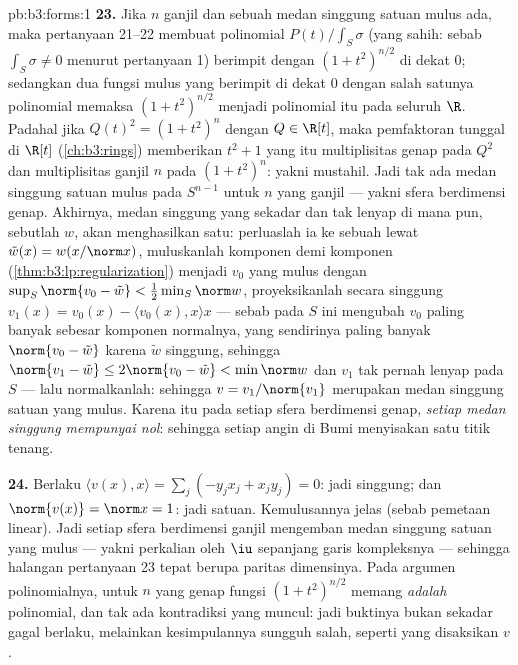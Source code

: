 \begin{solution}{pb:b3:forms:1}
\textbf{23.} Jika $n$ ganjil dan sebuah medan singgung satuan mulus
ada, maka pertanyaan 21--22 membuat polinomial
$P(t)/\int_S\sigma$ (yang sahih: sebab $\int_S\sigma \neq 0$ menurut
pertanyaan 1) berimpit dengan $(1 + t^2)^{n/2}$ di dekat $0$; sedangkan dua
fungsi mulus yang berimpit di dekat $0$ dengan salah satunya polinomial
memaksa $(1 + t^2)^{n/2}$ menjadi polinomial itu pada seluruh
$\R$. Padahal jika $Q(t)^2 = (1 + t^2)^n$ dengan $Q \in \R[t]$,
maka pemfaktoran tunggal di $\R[t]$
(\cref{ch:b3:rings}) memberikan $t^2 + 1$ yang  itu
multiplisitas genap pada $Q^2$ dan multiplisitas ganjil $n$ pada
$(1 + t^2)^n$: yakni mustahil. Jadi tak ada medan singgung satuan mulus
pada $S^{n-1}$ untuk $n$ yang ganjil --- yakni sfera
berdimensi genap. Akhirnya, medan singgung yang sekadar  dan
tak lenyap di mana pun, sebutlah $w$, akan menghasilkan satu: perluaslah ia ke sebuah
 lewat $\tilde w(x) = w(x/\norm x)$, muluskanlah
komponen demi komponen (\cref{thm:b3:lp:regularization}) menjadi
$v_0$ yang mulus dengan $\sup_S\norm{v_0 - \tilde w} <
\frac12\min_S\norm w$, proyeksikanlah secara singgung $v_1(x) = v_0(x)
- \langle v_0(x), x\rangle x$ --- sebab pada $S$ ini mengubah $v_0$
paling banyak sebesar komponen normalnya, yang sendirinya paling banyak $\norm{v_0 -
\tilde w}$ karena $\tilde w$ singgung, sehingga $\norm{v_1 - \tilde
w} \leq 2\norm{v_0 - \tilde w} < \min\norm w$ dan $v_1$
tak pernah lenyap pada $S$ --- lalu normalkanlah: sehingga $v =
v_1/\norm{v_1}$ merupakan medan singgung satuan yang mulus. Karena itu pada
setiap sfera berdimensi genap, \emph{setiap medan singgung
 mempunyai nol}: sehingga setiap angin di Bumi menyisakan satu titik
tenang.

\textbf{24.} Berlaku $\langle v(x), x\rangle = \sum_j(-y_jx_j +
x_jy_j) = 0$: jadi singgung; dan $\norm{v(x)} = \norm x = 1$: jadi satuan.
Kemulusannya jelas (sebab pemetaan linear). Jadi setiap sfera
berdimensi ganjil mengemban medan singgung satuan yang mulus --- yakni perkalian
oleh $\iu$ sepanjang garis kompleksnya --- sehingga
halangan pertanyaan 23 tepat berupa paritas dimensinya. Pada
argumen polinomialnya, untuk $n$ yang genap fungsi $(1 +
t^2)^{n/2}$ memang \emph{adalah} polinomial, dan tak ada kontradiksi
yang muncul: jadi buktinya bukan sekadar gagal berlaku, melainkan
kesimpulannya sungguh salah, seperti yang disaksikan $v$.


\end{solution}
